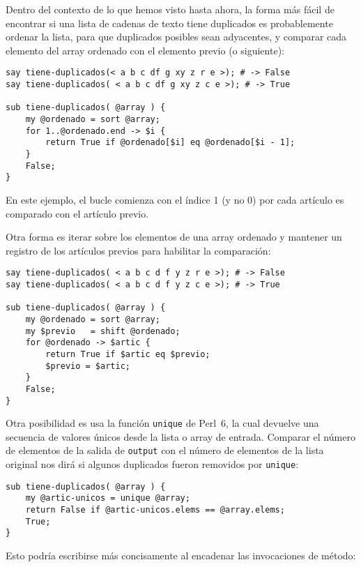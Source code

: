 Dentro del contexto de lo que hemos visto hasta ahora, 
la forma más fácil de encontrar si una lista de cadenas
de texto tiene duplicados es probablemente ordenar la
lista, para que duplicados posibles sean adyacentes, y 
comparar cada elemento del array ordenado con el
elemento previo (o siguiente):


\begin{verbatim}
say tiene-duplicados(< a b c df g xy z r e >); # -> False
say tiene-duplicados( < a b c df g xy z c e >); # -> True

sub tiene-duplicados( @array ) {
    my @ordenado = sort @array;
    for 1..@ordenado.end -> $i {
        return True if @ordenado[$i] eq @ordenado[$i - 1];
    }
    False;
}
\end{verbatim}
%

En este ejemplo, el bucle comienza con el índice 1 (y no 0)
por cada artículo es comparado con el artículo previo.

Otra forma es iterar sobre los elementos de una array ordenado
y mantener un registro de los artículos previos para habilitar
la  comparación:

\begin{verbatim}
say tiene-duplicados( < a b c d f y z r e >); # -> False
say tiene-duplicados( < a b c d f y z c e >); # -> True

sub tiene-duplicados( @array ) {
    my @ordenado = sort @array;
    my $previo   = shift @ordenado;
    for @ordenado -> $artic {
        return True if $artic eq $previo;
        $previo = $artic;
    }
    False;
}
\end{verbatim}
%

Otra posibilidad es usa la función {\tt unique} de Perl~6,
la cual devuelve una secuencia de valores únicos desde la
lista o array de entrada. Comparar el número de elementos de
la salida de {\tt output} con el número de elementos de la
lista original nos dirá si algunos duplicados fueron 
removidos por {\tt unique}:

\begin{verbatim}
sub tiene-duplicados( @array ) {
    my @artic-unicos = unique @array;
    return False if @artic-unicos.elems == @array.elems;
    True;
}
\end{verbatim}

Esto podría escribirse más concisamente al encadenar
las invocaciones de método:

